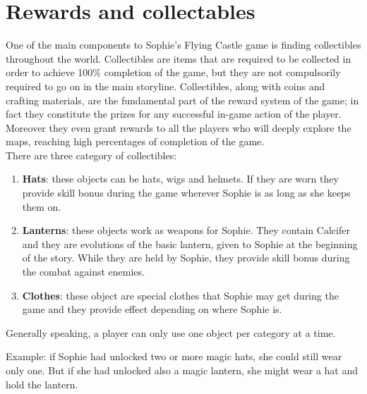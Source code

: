\section{Rewards and collectables}
One of the main components to Sophie's Flying Castle game is finding collectibles throughout the world.
Collectibles are items that are required to be collected in order to achieve 100\%
completion of the game, but they are not compulsorily required to go on in the main storyline. Collectibles, along with coins and crafting materials, are the fundamental part of the reward system of the game; in fact they constitute the prizes for any successful in-game action of the player. Moreover they even grant rewards to all the players who will deeply explore the maps, reaching high percentages of completion of the game.\\

There are three category of collectibles:
\begin{enumerate}
\item \textbf{Hats}: these objects can be hats, wigs and helmets. If they are worn they provide skill bonus during the game wherever Sophie is as long as she keeps them on.
\item \textbf{Lanterns}: these objects work as weapons for Sophie. They contain Calcifer and they are evolutions of the basic lantern, given to Sophie at the beginning of the story. While they are held by Sophie, they provide skill bonus during the combat against enemies. 
\item \textbf{Clothes}: these object are special clothes that Sophie may get during the game and they provide effect depending on where Sophie is.  
  \end{enumerate}

Generally speaking, a player can only use one object per category at a time.

Example: if Sophie had unlocked two or more magic hats, she could still wear only one. But if she had unlocked also a magic lantern, she might wear a hat and hold the lantern.

